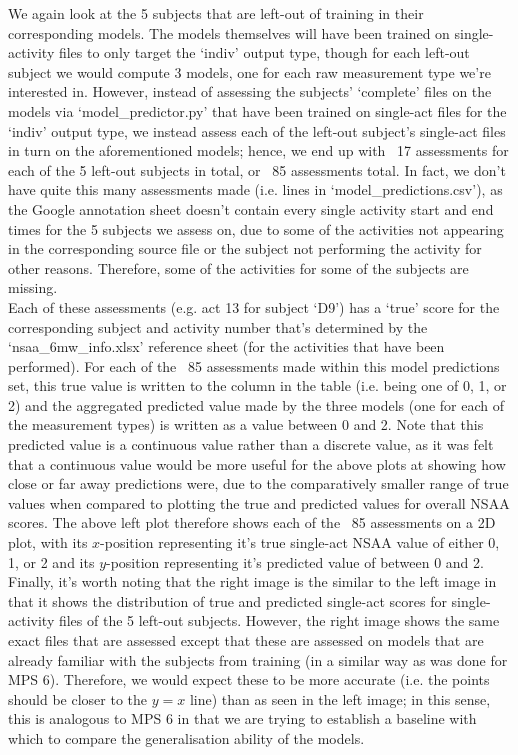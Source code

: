 \documentclass[12pt,twoside]{report}
\begin{document}
\quad We again look at the 5 subjects that are left-out of training in their corresponding models. The models themselves will have been trained on single-activity files to only target the ‘indiv’ output type, though for each left-out subject we would compute 3 models, one for each raw measurement type we’re interested in. However, instead of assessing the subjects’ ‘complete’ files on the models via ‘model\_predictor.py’ that have been trained on single-act files for the ‘indiv’ output type, we instead assess each of the left-out subject’s single-act files in turn on the aforementioned models; hence, we end up with ~17 assessments for each of the 5 left-out subjects in total, or ~85 assessments total. In fact, we don’t have quite this many assessments made (i.e. lines in ‘model\_predictions.csv’), as the Google annotation sheet doesn’t contain every single activity start and end times for the 5 subjects we assess on, due to some of the activities not appearing in the corresponding source file or the subject not performing the activity for other reasons. Therefore, some of the activities for some of the subjects are missing.\\

\quad Each of these assessments (e.g. act 13 for subject ‘D9’) has a ‘true’ score for the corresponding subject and activity number that’s determined by the ‘nsaa\_6mw\_info.xlsx’ reference sheet (for the activities that have been performed). For each of the ~85 assessments made within this model predictions set, this true value is written to the column in the table (i.e. being one of 0, 1, or 2) and the aggregated predicted value made by the three models (one for each of the measurement types) is written as a value between 0 and 2. Note that this predicted value is a continuous value rather than a discrete value, as it was felt that a continuous value would be more useful for the above plots at showing how close or far away predictions were, due to the comparatively smaller range of true values when compared to plotting the true and predicted values for overall NSAA scores. The above left plot therefore shows each of the ~85 assessments on a 2D plot, with its $x$-position representing it’s true single-act NSAA value of either 0, 1, or 2 and its $y$-position representing it’s predicted value of between 0 and 2.\\

\quad Finally, it’s worth noting that the right image is the similar to the left image in that it shows the distribution of true and predicted single-act scores for single-activity files of the 5 left-out subjects. However, the right image shows the same exact files that are assessed except that these are assessed on models that are already familiar with the subjects from training (in a similar way as was done for MPS 6). Therefore, we would expect these to be more accurate (i.e. the points should be closer to the $y=x$ line) than as seen in the left image; in this sense, this is analogous to MPS 6 in that we are trying to establish a baseline with which to compare the generalisation ability of the models.
\end{document}

